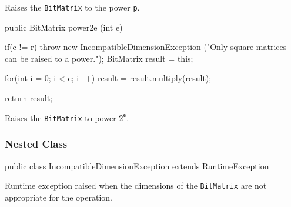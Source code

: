\begin{tabb} Raises the \texttt{BitMatrix} to the power \texttt{p}.
\end{tabb}
\begin{htmlonly}
\end{htmlonly}
\begin{code}

   public BitMatrix power2e (int e) \begin{hide} {
      if(c != r)
          throw new IncompatibleDimensionException
         ("Only square matrices can be raised to a power.");
      BitMatrix result = this;

      for(int i = 0; i < e; i++)
         result = result.multiply(result);

      return result;
   } \end{hide}
\end{code}
\begin{tabb} Raises the \texttt{BitMatrix} to power $2^{\mathtt{e}}$.
\end{tabb}
\begin{htmlonly}
\end{htmlonly}

\subsubsection* {Nested Class}

\begin{code}
   public class IncompatibleDimensionException extends RuntimeException
\end{code}
\begin{tabb} Runtime exception raised when the dimensions of the
  \texttt{BitMatrix} are not appropriate for the operation.
\end{tabb}
\begin{code}
  \begin{hide}
   {
      private IncompatibleDimensionException() {
         super();
      }

      private IncompatibleDimensionException (String message) {
         super(message);
      }
   }

}
\end{hide}
\end{code}

